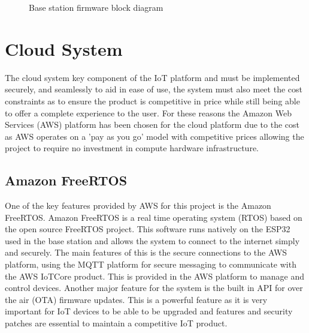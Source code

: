 \documentclass[12pt]{article}
\begin{document}
\begin{figure}[H]
    \centering
    \caption{Base station firmware block diagram}
    \label{fig:baseblock}
\end{figure}

\section{Cloud System}
The cloud system key component of the IoT platform and must be implemented securely, and
seamlessly to aid in ease of use, the system must also meet the cost constraints as to ensure the
product is competitive in price while still being able to offer a complete experience to the user.
For these reasons the Amazon Web Services (AWS) platform has been chosen for the cloud platform 
due to the cost as AWS operates on a 'pay as you go' model with competitive prices allowing the
project to require no investment in compute hardware infrastructure.

\subsection{Amazon FreeRTOS}
One of the key features provided by AWS for this project is the Amazon FreeRTOS. Amazon FreeRTOS
is a real time operating system (RTOS) based on the open source FreeRTOS project. This software
runs natively on the ESP32 used in the base station and allows the system to connect to the
internet simply and securely. The main features of this is the secure connections to the AWS
platform, using the MQTT platform for secure messaging to communicate with the AWS IoTCore
product. This is provided in the AWS platform to manage and control devices. Another major feature
for the system is the built in API for over the air (OTA) firmware updates. This is a powerful
feature as it is very important for IoT devices to be able to be upgraded and features and
security patches are essential to maintain a competitive IoT product.
\end{document}
